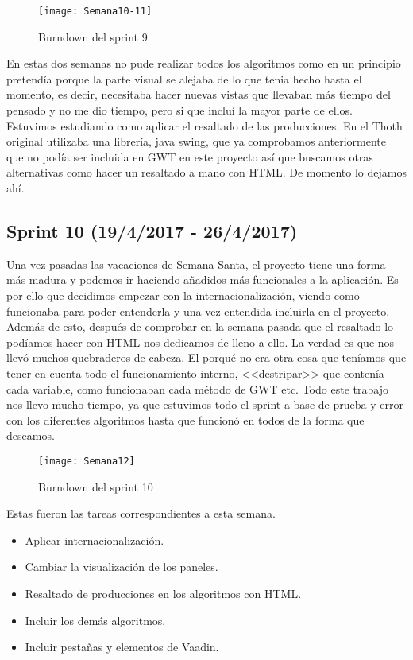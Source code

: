 \begin{figure}[h]
\centering
\texttt{[image: Semana10-11]}
\caption{Burndown del sprint 9}
\label{fig:A.2.6}
\end{figure}

En estas dos semanas no pude realizar todos los algoritmos como en un principio pretendía porque la parte visual se alejaba de lo que tenia hecho hasta el momento, es decir, necesitaba hacer nuevas vistas que llevaban más tiempo del pensado y no me dio tiempo, pero si que incluí la mayor parte de ellos. Estuvimos estudiando como aplicar el resaltado de las producciones. En el Thoth original utilizaba una librería, java swing, que ya comprobamos anteriormente que no podía ser incluida en GWT en este proyecto así que buscamos otras alternativas como hacer un resaltado a mano con HTML. De momento lo dejamos ahí.

\subsection{Sprint 10 (19/4/2017 - 26/4/2017)}

Una vez pasadas las vacaciones de Semana Santa, el proyecto tiene una forma más madura y podemos ir haciendo añadidos más funcionales a la aplicación. Es por ello que decidimos empezar con la internacionalización, viendo como funcionaba para poder entenderla y una vez entendida incluirla en el proyecto. Además de esto, después de comprobar en la semana pasada que el resaltado lo podíamos hacer con HTML nos dedicamos de lleno a ello. La verdad es que nos llevó muchos quebraderos de cabeza. El porqué no era otra cosa que teníamos que tener en cuenta todo el funcionamiento interno, <<destripar>> que contenía cada variable, como funcionaban cada método de GWT etc. Todo este trabajo nos llevo mucho tiempo, ya que estuvimos todo el sprint a base de prueba y error con los diferentes algoritmos hasta que funcionó en todos de la forma que deseamos.

\begin{figure}[h]
\centering
\texttt{[image: Semana12]}
\caption{Burndown del sprint 10}
\label{fig:A.2.6}
\end{figure}

Estas fueron las tareas correspondientes a esta semana.

\begin{itemize}
\item Aplicar internacionalización.
\item Cambiar la visualización de los paneles.
\item Resaltado de producciones en los algoritmos con HTML.
\item Incluir los demás algoritmos.
\item Incluir pestañas y elementos de Vaadin.
\end{itemize}

